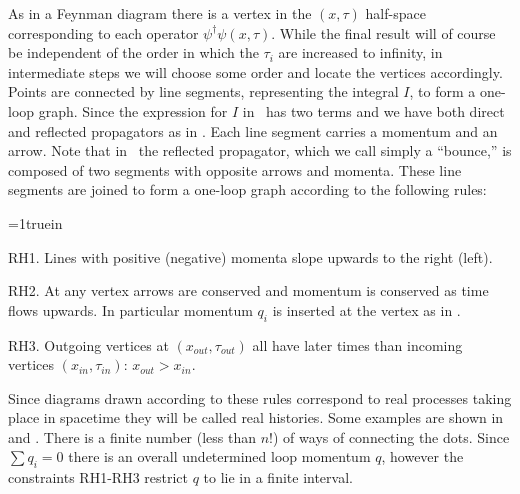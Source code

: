 As in a Feynman diagram there is a vertex in the $(x,\tau)$ half-space
corresponding to each operator $\psi^\dagger\psi(x,\tau)$.
While the final result will of course be independent of the order in which
the $\tau_i$ are increased to infinity, in intermediate steps we will
choose some order and locate the vertices accordingly.
Points are connected by line segments, representing the integral
$I$, to form a one-loop graph. Since the expression for $I$ in
\asympi\  has two terms and we have both direct
and reflected propagators as in
\fig{}.
Each line segment carries a momentum and an arrow. Note that
in \idiagram\ the reflected propagator, which we call simply
a ``bounce,'' is composed of two segments with opposite
arrows and momenta. These line segments are joined to form
a one-loop graph according to the following rules:
 
\medskip
 
{\parindent=1truein
\item{RH1.} Lines with positive (negative) momenta slope upwards to the
right (left).
 
\item{RH2.} At any vertex arrows are conserved and momentum
 is conserved as
time flows upwards. In particular momentum 
$q_i$ is inserted at the vertex      
as in
\fig{}.
 
\item{RH3.} Outgoing vertices at $(x_{out},\tau_{out})$ all have
later times than incoming vertices $(x_{in},\tau_{in})$: $x_{out}>x_{in}$.     
 
}
 
\medskip
 
Since diagrams drawn according to these rules correspond to 
real processes taking place in spacetime they will be called real
histories. Some examples are shown in
\fig{}
and
\fig{}.
There is a finite number (less than $n!$) of ways of connecting
the dots. Since $\sum q_i=0$ there is an overall undetermined
loop momentum $q$, however the constraints RH1-RH3 restrict $q$
to lie in a finite interval.
 
